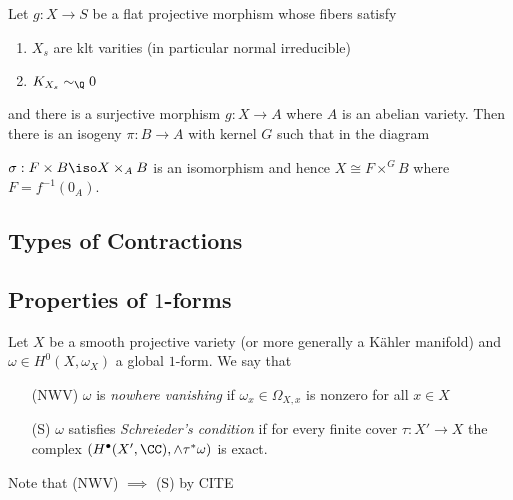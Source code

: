 \documentclass[12pt]{article}
\theoremstyle{plain}
\begin{document}
\begin{theorem}
Let $g : X \to S$ be a flat projective morphism whose fibers satisfy
\begin{enumerate}
\item $X_s$ are klt varities (in particular normal irreducible) 
\item $K_{X_s} \sim_{\Q} 0$
\end{enumerate}
and there is a surjective morphism $g : X \to A$ where $A$ is an abelian variety. Then there is an isogeny $\pi : B \to A$ with kernel $G$ such that in the diagram
\begin{center}
\end{center}
$\sigma : F \times B \iso X \times_A B$ is an isomorphism and hence $X \cong F \times^G B$ where $F = f^{-1}(0_A)$. 
\end{theorem}

\subsection{Types of Contractions}

\subsection{Properties of $1$-forms}



\begin{defn}
Let $X$ be a smooth projective variety (or more generally a K\"{a}hler manifold) and $\omega \in H^0(X, \omega_X)$ a global $1$-form. We say that
\begin{enumerate}
\item[(NWV)] $\omega$ is \textit{nowhere vanishing} if $\omega_x \in \Omega_{X,x}$ is nonzero for all $x \in X$
\item[(S)] $\omega$ satisfies \textit{Schreieder's condition} if for every finite \etale cover $\tau : X' \to X$ the complex $(H^\bullet(X', \CC), \wedge \tau^* \omega)$ is exact.
\end{enumerate}
\end{defn}

Note that (NWV) $\implies$ (S) by {\color{red} CITE}
\end{document}
